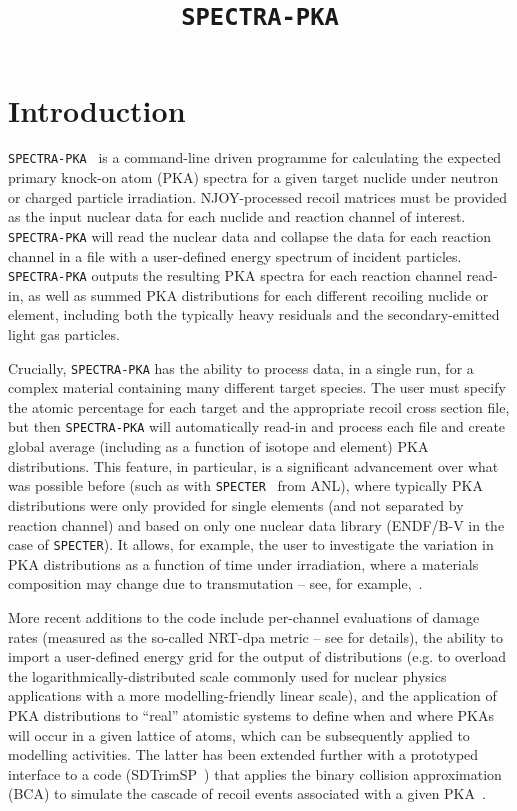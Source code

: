 \documentclass[a4paper]{article}
\begin{document}
\title{\texttt{SPECTRA-PKA}}

\maketitle
\section{Introduction}
\texttt{SPECTRA-PKA}~\cite{gilbertmariansublet2015,gilbertsubletNME2016,gilbertsublet2018,spectrapkaavailablefrom,gilbertNSE2025} is a command-line driven programme for calculating the expected primary knock-on atom (PKA) spectra for a given target nuclide under neutron or charged particle irradiation. NJOY-processed recoil matrices must be provided as the input nuclear data for each nuclide and reaction channel of interest. \texttt{SPECTRA-PKA} will read the nuclear data and collapse the data for each reaction channel in a file with a user-defined energy spectrum of incident particles. \texttt{SPECTRA-PKA} outputs the resulting PKA spectra for each reaction channel read-in, as well as summed PKA distributions for each different recoiling nuclide or element, including both the typically heavy residuals and the secondary-emitted light gas particles. 

Crucially, \texttt{SPECTRA-PKA} has the ability to process data, in a single run, for a complex material containing many different target species. The user must specify the atomic percentage for each target and the appropriate recoil cross section file, but then \texttt{SPECTRA-PKA} will automatically read-in and process each file and create global average (including as a function of isotope and element) PKA distributions. This feature, in particular, is a significant advancement over what was possible before (such as with \texttt{SPECTER}~\cite{specter} from ANL), where typically PKA distributions were only provided for single elements (and not separated by reaction channel) and based on only one nuclear data library (ENDF/B-V in the case of \texttt{SPECTER}). It allows, for example, the user to investigate the variation in PKA distributions as a function of time under irradiation, where a materials composition may change due to transmutation -- see, for example,~\cite{gilbertsubletNME2016}. 

More recent additions to the code include per-channel evaluations of damage rates (measured as the so-called NRT-dpa metric -- see \cite{gilbertsublet2018} for details), the ability to import a user-defined energy grid for the output of distributions (e.g. to overload the logarithmically-distributed scale commonly used for nuclear physics applications with a more modelling-friendly linear scale), and the application of PKA distributions to ``real'' atomistic systems to define when and where PKAs will occur in a given lattice of atoms, which can be subsequently applied to modelling activities.  The latter has been extended further with a prototyped interface to a code (SDTrimSP~\cite{sdtrimsp}) that applies the binary collision approximation (BCA) to simulate the cascade of recoil events associated with a given PKA~\cite{gilbertNSE2025}.
\end{document}
